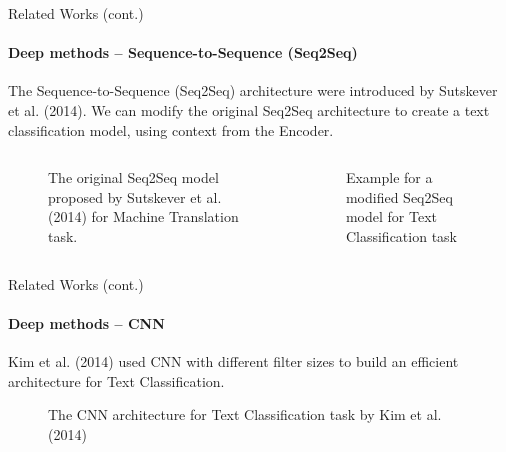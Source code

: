 \begin{frame}{Related Works (cont.)}
\framesubtitle{Deep methods -- Sequence-to-Sequence (Seq2Seq)}
The Sequence-to-Sequence (Seq2Seq) architecture were introduced by Sutskever et al. (2014)\cite{Sutskever2014}. We can modify the original Seq2Seq architecture to create a text classification model, using context from the Encoder.
\begin{columns}
\begin{column}{.5\textwidth}
\begin{figure}
\centering
{}
\caption{The original Seq2Seq model proposed by Sutskever et al. (2014) for Machine Translation task\cite{Sutskever2014}.}
\end{figure}
\end{column}
\begin{column}{.5\textwidth}
\begin{figure}
\centering
{}
\caption{Example for a modified Seq2Seq model for Text Classification task}
\end{figure}
\end{column}
\end{columns}
\end{frame}

\begin{frame}{Related Works (cont.)}
\framesubtitle{Deep methods -- CNN}
Kim et al. (2014)\cite{Kim2014} used CNN with different filter sizes to build an efficient architecture for Text Classification.
\begin{figure}
\centering
{}
\caption{The CNN architecture for Text Classification task by Kim et al. (2014)\cite{Kim2014}}
\end{figure}
\end{frame}

